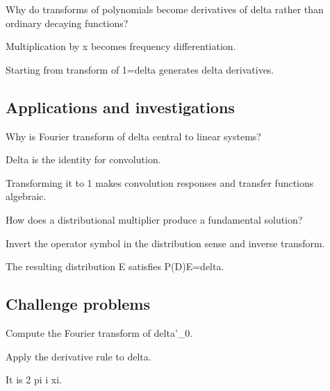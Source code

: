 \begin{exercise}\label{exr:iii19-expand-12}
Why do transforms of polynomials become derivatives of delta rather than ordinary decaying functions?
\end{exercise}
\begin{hint}
Multiplication by x becomes frequency differentiation.
\end{hint}
\begin{solution}
Starting from transform of 1=delta generates delta derivatives.
\end{solution}

\subsection*{Applications and investigations}

\begin{exercise}\label{exr:iii19-expand-13}
Why is Fourier transform of delta central to linear systems?
\end{exercise}
\begin{hint}
Delta is the identity for convolution.
\end{hint}
\begin{solution}
Transforming it to 1 makes convolution responses and transfer functions algebraic.
\end{solution}

\begin{exercise}\label{exr:iii19-expand-14}
How does a distributional multiplier produce a fundamental solution?
\end{exercise}
\begin{hint}
Invert the operator symbol in the distribution sense and inverse transform.
\end{hint}
\begin{solution}
The resulting distribution E satisfies P(D)E=delta.
\end{solution}

\subsection*{Challenge problems}

\begin{exercise}\label{exr:iii19-expand-15}
Compute the Fourier transform of delta'\_0.
\end{exercise}
\begin{hint}
Apply the derivative rule to delta.
\end{hint}
\begin{solution}
It is 2 pi i xi.
\end{solution}

